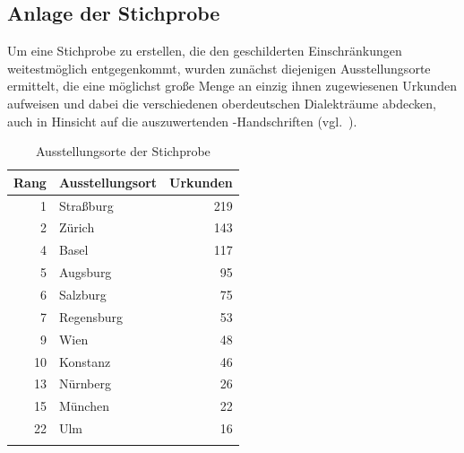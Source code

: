 
\subsection{Anlage der Stichprobe}
\label{subsec:cao_sample}

Um eine Stichprobe zu erstellen, die den geschilderten Einschränkungen
weitestmöglich entgegenkommt, wurden zunächst diejenigen Ausstellungs\-orte
ermittelt, die eine möglichst große Menge an einzig ihnen zugewiesenen Urkunden
aufweisen und dabei die verschiedenen oberdeutschen
Dialekt\-räume abdecken, auch in Hinsicht auf die auszuwertenden
\KC{}-Handschriften (vgl.~).

\begin{table}
\centering
\caption{Ausstellungsorte der Stichprobe}
\begin{tabular}{r l r}
\lsptoprule
Rang
	& Ausstellungs\-ort
	& Urkunden
	\\

\midrule

 1 & Straßburg  & 219 \\
 2 & Zürich     & 143 \\
 4 & Basel      & 117 \\
 5 & Augsburg   &  95 \\
 6 & Salzburg   &  75 \\
 7 & Regensburg &  53 \\
 9 & Wien       &  48 \\
10 & Konstanz	&  46 \\
13 & Nürnberg   &  26 \\
15 & München    &  22 \\
22 & Ulm        &  16 \\

\lspbottomrule
\end{tabular}
\label{tab:adjstpr_orte}
\end{table}

